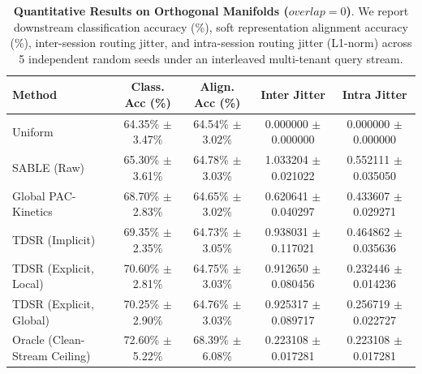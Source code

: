 \begin{table}[h]
\caption{\textbf{Quantitative Results on Orthogonal Manifolds ($overlap=0$)}. We report downstream classification accuracy (\%), soft representation alignment accuracy (\%), inter-session routing jitter, and intra-session routing jitter (L1-norm) across 5 independent random seeds under an interleaved multi-tenant query stream.}
\label{tab:results_orthogonal}
\vskip 0.15in
\begin{center}
\begin{small}
\begin{sc}
\begin{tabular}{lcccc}
\toprule
Method & Class. Acc (\%) & Align. Acc (\%) & Inter Jitter & Intra Jitter \\
\midrule
Uniform & 64.35\% $\pm$ 3.47\% & 64.54\% $\pm$ 3.02\% & 0.000000 $\pm$ 0.000000 & 0.000000 $\pm$ 0.000000 \\
SABLE (Raw) & 65.30\% $\pm$ 3.61\% & 64.78\% $\pm$ 3.03\% & 1.033204 $\pm$ 0.021022 & 0.552111 $\pm$ 0.035050 \\
Global PAC-Kinetics & 68.70\% $\pm$ 2.83\% & 64.65\% $\pm$ 3.02\% & 0.620641 $\pm$ 0.040297 & 0.433607 $\pm$ 0.029271 \\
\midrule
TDSR (Implicit) & 69.35\% $\pm$ 2.35\% & 64.73\% $\pm$ 3.05\% & 0.938031 $\pm$ 0.117021 & 0.464862 $\pm$ 0.035636 \\
TDSR (Explicit, Local) & 70.60\% $\pm$ 2.81\% & 64.75\% $\pm$ 3.03\% & 0.912650 $\pm$ 0.080456 & 0.232446 $\pm$ 0.014236 \\
TDSR (Explicit, Global) & 70.25\% $\pm$ 2.90\% & 64.76\% $\pm$ 3.03\% & 0.925317 $\pm$ 0.089717 & 0.256719 $\pm$ 0.022727 \\
\midrule
Oracle (Clean-Stream Ceiling) & 72.60\% $\pm$ 5.22\% & 68.39\% $\pm$ 6.08\% & 0.223108 $\pm$ 0.017281 & 0.223108 $\pm$ 0.017281 \\
\bottomrule
\end{tabular}
\end{sc}
\end{small}
\end{center}
\vskip -0.1in
\end{table}

